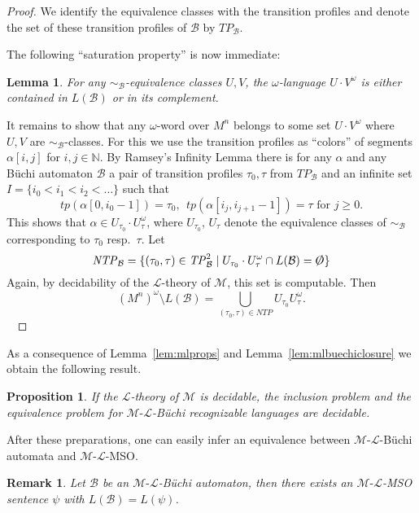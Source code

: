 \documentclass[copyright,creativecommons]{eptcs}
\newtheorem{lemma}[theorem]{Lemma}
\newtheorem{proposition}[theorem]{Proposition}
\theoremstyle{plain}
\newtheorem{remark}[theorem]{Remark}
\theoremstyle{nonumberplain}
\newtheorem{proof}{Proof}
\renewcommand{\emptyset}{\protect\raisebox{.15ex}{\ensuremath{\not}}\ensuremath{\mathnormal{O}}}
\newcommand{\m}{\ensuremath{\mathcal{M}}}
\newcommand{\el}{\ensuremath{\mathcal{L}}}
\newcommand{\ml}{\ensuremath{\m\textrm{-}\el}}
\newcommand{\tp}{\ensuremath{\mathit{tp}}}
\begin{document}
\begin{proof}
We identify the equivalence classes with the transition profiles and denote the set of these transition profiles of $\mathcal{B}$ by $\mathit{TP}_\mathcal{B}$. 
 
The following ``saturation property'' is now immediate: 

\begin{lemma}\label{saturation}
For any $\sim_\mathcal{B}$-equivalence classes $U, V$, the $\omega$-language 
$U \cdot V^\omega$ is either contained in $L(\mathcal{B})$ or in its 
complement.  
\end{lemma}

It remains to show that any $\omega$-word over $M^n$ belongs to some set 
$U \cdot V^\omega$ where $U,V$ are $\sim_\mathcal{B}$-classes. For this we 
use the transition profiles as ``colors'' of segments $\alpha[i, j]$ for $i,j \in \mathbb{N}$. 
By Ramsey's Infinity Lemma \cite{ram30} there is for any $\alpha$ and any 
B\"uchi automaton $\mathcal{B}$ a pair of transition profiles $\tau_0, \tau$ from 
$\mathit{TP}_\mathcal{B}$ and an infinite set $I = \{i_0 < i_1 < i_2 < \ldots \}$ such that 
$$ \tp(\alpha[0,i_0 -1]) = \tau_0, \ \ \tp(\alpha[i_j, i_{j+1}-1]) = \tau \text{ for }j \geq 0.$$ 
This shows that $\alpha \in U_{\tau_0} \cdot U^\omega_{\tau}$, where $U_{\tau_0}$, $U_{\tau}$ denote the equivalence classes of $\sim_{\mathcal{B}}$ corresponding to $\tau_0$ resp.\ $\tau$. 
Let  
$$\mathit{NTP}_\mathcal{B} = \{(\tau_0,\tau) \in \mathit{TP}_\mathcal{B}^2 \mid 
U_{\tau_0} \cdot U_{\tau}^{\omega} \cap L(\mathcal{B}) = \emptyset\}$$ 
Again, by decidability of the $\el$-theory of $\m$, this set is computable. 
Then 
$$(M^n)^{\omega} \setminus  L(\mathcal{B}) = \bigcup_{(\tau_0,\tau) \in \mathit{NTP}}{U_{\tau_0}U_{\tau}^{\omega}}.$$
\ 
\end{proof}

As a consequence of Lemma~\ref{lem:mlprops} and Lemma~\ref{lem:mlbuechiclosure} we obtain the following result. 

\begin{proposition}\label{prop:inclusionEquivBuechi}
If the $\el$-theory of $\m$ is decidable, the inclusion problem and the equivalence problem for 
\ml-B{\"u}chi recognizable languages are decidable. 
\end{proposition}


After these preparations, one can easily infer an equivalence between \ml-B{\"u}chi automata 
and \ml-MSO.

\begin{remark}\label{rem:AtoFBuechi}
Let $\mathcal{B}$ be an \ml-B{\"u}chi automaton, then there exists an \ml-MSO sentence $\psi$ with $L(\mathcal{B}) = L(\psi)$.
\end{remark}
\end{document}
